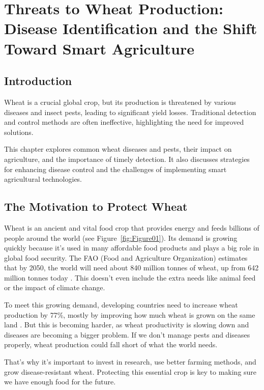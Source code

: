 \chapter{Threats to Wheat Production: Disease Identification and the Shift Toward Smart Agriculture}

\section{Introduction}

Wheat is a crucial global crop, but its production is threatened by various diseases and insect pests, leading to significant yield losses. Traditional detection and control methods are often ineffective, highlighting the need for improved solutions. 

This chapter explores common wheat diseases and pests, their impact on agriculture, and the importance of timely detection. It also discusses strategies for enhancing disease control and the challenges of implementing smart agricultural technologies.



\section{The Motivation to Protect Wheat}

Wheat is an ancient and vital food crop that provides energy and feeds billions of people around the world (see Figure~\ref{fig:Figure01}). Its demand is growing quickly because it’s used in many affordable food products and plays a big role in global food security. The FAO (Food and Agriculture Organization) estimates that by 2050, the world will need about 840 million tonnes of wheat, up from 642 million tonnes today \parencite{sharma2015wheat}. This doesn’t even include the extra needs like animal feed or the impact of climate change.

To meet this growing demand, developing countries need to increase wheat production by 77\%, mostly by improving how much wheat is grown on the same land \parencite{sharma2015wheat}. But this is becoming harder, as wheat productivity is slowing down and diseases are becoming a bigger problem. If we don’t manage pests and diseases properly, wheat production could fall short of what the world needs.

That’s why it's important to invest in research, use better farming methods, and grow disease-resistant wheat. Protecting this essential crop is key to making sure we have enough food for the future.


